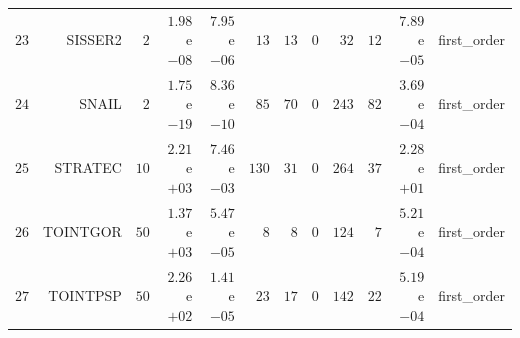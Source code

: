 \begin{longtable}{rrrrrrrrrrrr}
  \(    23\) & SISSER2 & \(     2\) & \( 1.98\)e\(-08\) & \( 7.95\)e\(-06\) & \(    13\) & \(    13\) & \(     0\) & \(    32\) & \(    12\) & \( 7.89\)e\(-05\) & first\_order \\
  \(    24\) & SNAIL & \(     2\) & \( 1.75\)e\(-19\) & \( 8.36\)e\(-10\) & \(    85\) & \(    70\) & \(     0\) & \(   243\) & \(    82\) & \( 3.69\)e\(-04\) & first\_order \\
  \(    25\) & STRATEC & \(    10\) & \( 2.21\)e\(+03\) & \( 7.46\)e\(-03\) & \(   130\) & \(    31\) & \(     0\) & \(   264\) & \(    37\) & \( 2.28\)e\(+01\) & first\_order \\
  \(    26\) & TOINTGOR & \(    50\) & \( 1.37\)e\(+03\) & \( 5.47\)e\(-05\) & \(     8\) & \(     8\) & \(     0\) & \(   124\) & \(     7\) & \( 5.21\)e\(-04\) & first\_order \\
  \(    27\) & TOINTPSP & \(    50\) & \( 2.26\)e\(+02\) & \( 1.41\)e\(-05\) & \(    23\) & \(    17\) & \(     0\) & \(   142\) & \(    22\) & \( 5.19\)e\(-04\) & first\_order \\\hline
\end{longtable}
